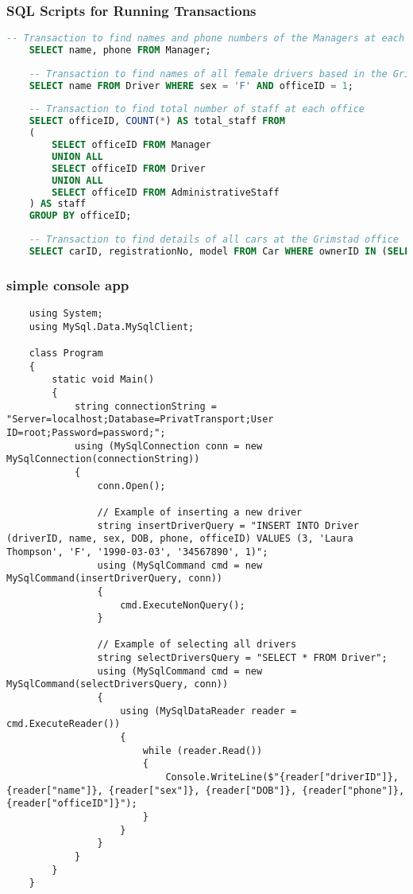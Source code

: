 \documentclass[a4paper,12pt]{article}
\begin{document}
\subsubsection*{SQL Scripts for Running Transactions}
\begin{lstlisting}[language=SQL]
    -- Transaction to find names and phone numbers of the Managers at each office
    SELECT name, phone FROM Manager;
    
    -- Transaction to find names of all female drivers based in the Grimstad office
    SELECT name FROM Driver WHERE sex = 'F' AND officeID = 1;
    
    -- Transaction to find total number of staff at each office
    SELECT officeID, COUNT(*) AS total_staff FROM 
    (
        SELECT officeID FROM Manager 
        UNION ALL 
        SELECT officeID FROM Driver 
        UNION ALL 
        SELECT officeID FROM AdministrativeStaff
    ) AS staff
    GROUP BY officeID;
    
    -- Transaction to find details of all cars at the Grimstad office
    SELECT carID, registrationNo, model FROM Car WHERE ownerID IN (SELECT ownerID FROM CarOwner WHERE officeID = 1);    
\end{lstlisting}

\subsubsection*{simple console app}
\begin{verbatim}
    using System;
    using MySql.Data.MySqlClient;
    
    class Program
    {
        static void Main()
        {
            string connectionString = "Server=localhost;Database=PrivatTransport;User ID=root;Password=password;";
            using (MySqlConnection conn = new MySqlConnection(connectionString))
            {
                conn.Open();
    
                // Example of inserting a new driver
                string insertDriverQuery = "INSERT INTO Driver (driverID, name, sex, DOB, phone, officeID) VALUES (3, 'Laura Thompson', 'F', '1990-03-03', '34567890', 1)";
                using (MySqlCommand cmd = new MySqlCommand(insertDriverQuery, conn))
                {
                    cmd.ExecuteNonQuery();
                }
    
                // Example of selecting all drivers
                string selectDriversQuery = "SELECT * FROM Driver";
                using (MySqlCommand cmd = new MySqlCommand(selectDriversQuery, conn))
                {
                    using (MySqlDataReader reader = cmd.ExecuteReader())
                    {
                        while (reader.Read())
                        {
                            Console.WriteLine($"{reader["driverID"]}, {reader["name"]}, {reader["sex"]}, {reader["DOB"]}, {reader["phone"]}, {reader["officeID"]}");
                        }
                    }
                }
            }
        }
    }    
\end{verbatim}
\end{document}
